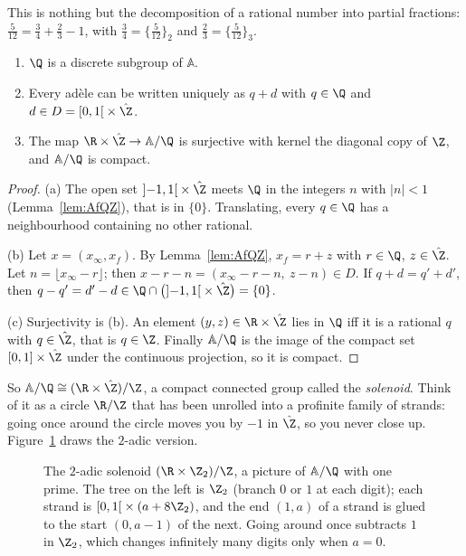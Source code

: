This is nothing but the decomposition of a rational number into partial fractions: $\frac{5}{12}=\frac34+\frac23-1$, with
$\frac34=\{\frac5{12}\}_2$ and $\frac23=\{\frac5{12}\}_3$.

\begin{theorem}\label{thm:Qdiscrete}
\begin{enumerate}[label=(\alph*)]
\item $\Q$ is a discrete subgroup of $\mathbb{A}$.
\item Every ad\`ele can be written uniquely as $q+d$ with $q\in\Q$ and $d\in D=\left[0,1\right[\times\hat{\Z}$.
\item The map $\R\times\hat{\Z}\to\mathbb{A}/\Q$ is surjective with kernel the diagonal copy of $\Z$, and $\mathbb{A}/\Q$ is compact.
\end{enumerate}
\end{theorem}
\begin{proof}
(a) The open set $\left]-1,1\right[\times\hat{\Z}$ meets $\Q$ in the integers $n$ with $|n|<1$ (Lemma~\ref{lem:AfQZ}), that is in $\{0\}$.
Translating, every $q\in\Q$ has a neighbourhood containing no other rational.

(b) Let $x=(x_\infty,x_f)$. By Lemma~\ref{lem:AfQZ}, $x_f=r+z$ with $r\in\Q$, $z\in\hat{\Z}$. Let $n=\lfloor x_\infty-r\rfloor$; then
$x-r-n=(x_\infty-r-n,\ z-n)\in D$. If $q+d=q'+d'$, then $q-q'=d'-d\in\Q\cap\bigl(\left]-1,1\right[\times\hat{\Z}\bigr)=\{0\}$.

(c) Surjectivity is (b). An element $(y,z)\in\R\times\hat{\Z}$ lies in $\Q$ iff it is a rational $q$ with $q\in\hat{\Z}$, that is $q\in\Z$.
Finally $\mathbb{A}/\Q$ is the image of the compact set $[0,1]\times\hat{\Z}$ under the continuous projection, so it is compact.
\end{proof}

So $\mathbb{A}/\Q\cong(\R\times\hat{\Z})/\Z$, a compact connected group called the \emph{solenoid}. Think of it as a circle $\R/\Z$ that
has been unrolled into a profinite family of strands: going once around the circle moves you by $-1$ in $\hat{\Z}$, so you never close up.
Figure~\ref{fig:solenoid} draws the $2$-adic version.

\begin{figure}[ht]
\centering
{}
\caption{The $2$-adic solenoid $(\R\times\Z_2)/\Z$, a picture of $\mathbb{A}/\Q$ with one prime. The tree on the left is $\Z_2$ (branch
$0$ or $1$ at each digit); each strand is $\left[0,1\right[\times(a+8\Z_2)$, and the end $(1,a)$ of a strand is glued to the start
$(0,a-1)$ of the next. Going around once subtracts $1$ in $\Z_2$, which changes infinitely many digits only when $a=0$.}
\label{fig:solenoid}
\end{figure}


